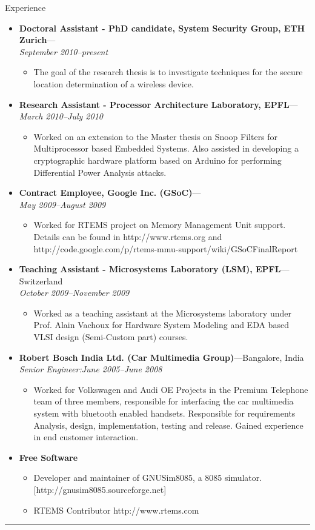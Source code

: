 \documentclass[11pt,oneside]{article}
\newenvironment{ressection}[1]{
	\vspace{4pt}
	{\fontfamily{phv}\selectfont\Large#1}
	\begin{itemize}
	\vspace{3pt}
}{
	\end{itemize}
}
\newcommand{\resitem}[1]{
	\vspace{-4pt}
	\item \begin{flushleft} #1 \end{flushleft}
}
\newcommand{\ressubitem}[1]{
	\vspace{-1pt}
	\item \begin{flushleft} #1 \end{flushleft}
}
\newcommand{\resbigitem}[3]{
	\vspace{-5pt}
	\item
	\textbf{#1}---#2 \\
	\textit{#3}
}
\newenvironment{ressubsec}[3]{
	\resbigitem{#1}{#2}{#3}
	\vspace{-2pt}
	\begin{itemize}
}{
	\end{itemize}
}
\newenvironment{reslist}[1]{
	\resitem{\textbf{#1}}
	\vspace{-5pt}
	\begin{itemize}
}{
	\end{itemize}
}
\begin{document}
\begin{ressection}{Experience}

  \begin{ressubsec}{Doctoral Assistant - PhD candidate, System Security Group,
    ETH Zurich}{}{September 2010--present}
  \ressubitem{The goal of the research thesis is to investigate techniques for
    the secure location determination of a wireless device.}
  \end{ressubsec}

      \begin{ressubsec}{Research Assistant - Processor Architecture
          Laboratory, EPFL}{}{March 2010--July 2010}
        \ressubitem{Worked on an extension to the Master thesis on Snoop
          Filters for Multiprocessor based Embedded Systems. Also assisted in
          developing a cryptographic hardware platform based on Arduino for
          performing Differential Power Analysis attacks.}
       \end{ressubsec}	

    \begin{ressubsec}{Contract Employee, Google Inc. (GSoC)}{}{May 2009--August 2009}
      \ressubitem{Worked for RTEMS project on Memory Management Unit support.
        Details can be found in http://www.rtems.org and
        http://code.google.com/p/rtems-mmu-support/wiki/GSoCFinalReport }
       \end{ressubsec}	

    \begin{ressubsec}{Teaching Assistant - Microsystems Laboratory (LSM),
        EPFL}{Switzerland}{October 2009--November 2009}
	    \ressubitem{Worked as a teaching assistant at the Microsystems
        laboratory under Prof. Alain Vachoux for Hardware System Modeling and
        EDA based VLSI design (Semi-Custom part) courses.}\end{ressubsec}

	
	\begin{ressubsec}{Robert Bosch India Ltd. (Car Multimedia Group)}{Bangalore, India}{Senior Engineer:June 2005--June 2008}
		\ressubitem{Worked for Volkswagen and Audi OE Projects in the Premium
      Telephone team of three members, responsible for interfacing the car
      multimedia system with bluetooth enabled handsets. Responsible for
      requirements Analysis, design, implementation, testing and release.
      Gained experience in end customer interaction.}	\end{ressubsec}
	\newpage   
	\begin{reslist}{Free Software}
		\ressubitem{Developer and maintainer of GNUSim8085, a 8085 simulator. [http://gnusim8085.sourceforge.net]}
    \ressubitem{RTEMS Contributor http://www.rtems.com}
	\end{reslist}

\end{ressection}
\rule{\textwidth}{.5pt}
\end{document}
